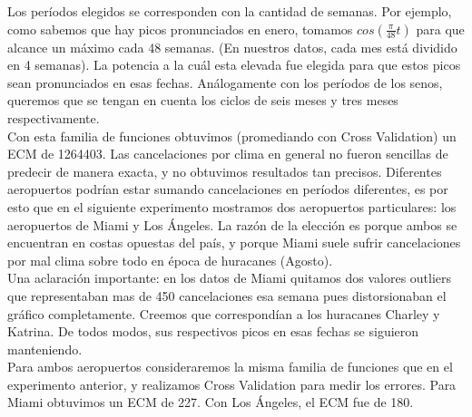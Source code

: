 Los períodos elegidos se corresponden con la cantidad de semanas. Por ejemplo, como sabemos que hay picos pronunciados en enero, tomamos $cos(\frac{\pi}{48} t)$ para que alcance un máximo cada 48 semanas. (En nuestros datos, cada mes está dividido en 4 semanas). La potencia a la cuál esta elevada fue elegida para que estos picos sean pronunciados en esas fechas. Análogamente con los períodos de los senos, queremos que se tengan en cuenta los ciclos de seis meses y tres meses respectivamente. \\

Con esta familia de funciones obtuvimos (promediando con Cross Validation) un ECM de 1264403. Las cancelaciones por clima en general no fueron sencillas de predecir de manera exacta, y no obtuvimos resultados tan precisos. Diferentes aeropuertos podrían estar sumando cancelaciones en períodos diferentes, es por esto que en el siguiente experimento mostramos dos aeropuertos particulares: los aeropuertos de Miami y Los Ángeles. La razón de la elección es porque ambos se encuentran en costas opuestas del país, y porque Miami suele sufrir cancelaciones por mal clima sobre todo en época de huracanes (Agosto). \\

Una aclaración importante: en los datos de Miami quitamos dos valores outliers que representaban mas de 450 cancelaciones esa semana pues distorsionaban el gráfico completamente. Creemos que correspondían a los huracanes Charley y Katrina. De todos modos, sus respectivos picos en esas fechas se siguieron manteniendo. \\

Para ambos aeropuertos consideraremos la misma familia de funciones que en el experimento anterior, y realizamos Cross Validation para medir los errores. Para Miami obtuvimos un ECM de 227. Con Los Ángeles, el ECM fue de 180.




